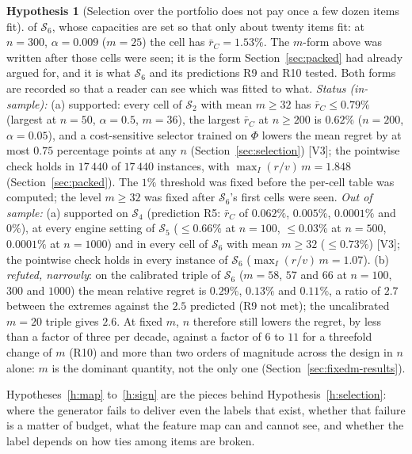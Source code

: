 \documentclass[a4paper,11pt]{article}
\newcommand{\evid}[1]{\textcolor{inkSoft}{\scriptsize[#1]}}
\theoremstyle{plain}
\theoremstyle{definition}
\newtheorem{hypothesis}{Hypothesis}
\theoremstyle{remark}
\begin{document}
\begin{hypothesis}[Selection over the portfolio does not pay once a few dozen items fit]
of $\mathcal S_6$, whose capacities are set so that only about twenty items fit: at $n=300$,
$\alpha=0.009$ ($m=25$) the cell has $\bar r_C=1.53\%$. The $m$-form above was written after
those cells were seen; it is the form Section~\ref{sec:packed} had already argued for, and it
is what $\mathcal S_6$ and its predictions R9 and R10 tested. Both forms are
recorded so that a reader can see which was fitted to what.
\emph{Status (in-sample):} (a) supported: every cell of $\mathcal S_2$ with mean $m\ge32$ has
$\bar r_C\le0.79\%$ (largest at $n=50$, $\alpha=0.5$, $m=36$), the largest $\bar r_C$ at
$n\ge200$ is $0.62\%$ ($n=200$, $\alpha=0.05$), and a cost-sensitive selector trained on
$\Phi$ lowers the mean regret by at most $0.75$ percentage points at any $n$
(Section~\ref{sec:selection}) \evid{V3}; the pointwise check holds in $17\,440$ of $17\,440$
instances, with $\max_I(r/v)\,m=1.848$ (Section~\ref{sec:packed}). The $1\%$ threshold was
fixed before the per-cell table was computed; the level $m\ge32$ was fixed after $\mathcal S_6$'s first cells
were seen.
\emph{Out of sample:} (a) supported on $\mathcal S_4$ (prediction R5: $\bar r_C$ of $0.062\%$,
$0.005\%$, $0.0001\%$ and $0\%$), at every engine setting of $\mathcal S_5$ ($\le0.66\%$ at
$n=100$, $\le0.03\%$ at $n=500$, $0.0001\%$ at $n=1000$) and in every cell of $\mathcal S_6$
with mean $m\ge32$ ($\le0.73\%$) \evid{V3}; the pointwise check holds in every instance of
$\mathcal S_6$ ($\max_I(r/v)\,m=1.07$). (b) \emph{refuted, narrowly}: on the calibrated
triple of $\mathcal S_6$ ($m=58$, $57$ and $66$ at $n=100$, $300$ and $1000$) the mean
relative regret is $0.29\%$, $0.13\%$ and $0.11\%$, a ratio of $2.7$ between the extremes
against the $2.5$ predicted (R9 not met); the uncalibrated $m=20$ triple gives $2.6$. At
fixed $m$, $n$ therefore still lowers the regret, by less than a factor of three per decade,
against a factor of $6$ to $11$ for a threefold change of $m$ (R10) and more than two orders
of magnitude across the design in $n$ alone: $m$ is the dominant quantity, not the only one
(Section~\ref{sec:fixedm-results}).
\end{hypothesis}

Hypotheses~\ref{h:map} to~\ref{h:sign} are the pieces behind Hypothesis~\ref{h:selection}:
where the generator fails to deliver even the labels that exist, whether that failure is a
matter of budget, what the feature map can and cannot see, and whether the label depends on
how ties among items are broken.
\end{document}
